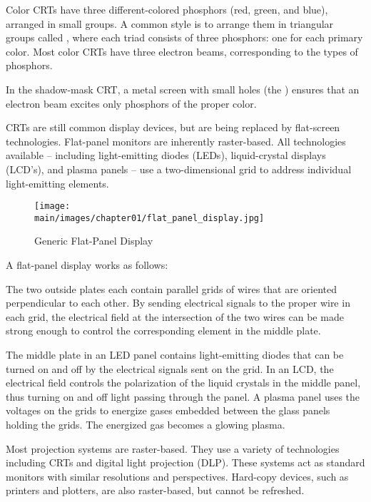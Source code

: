 \documentclass[\main/notes.tex]{subfiles}
\begin{document}
				Color CRTs have three different-colored phosphors (red, green, and blue),
				arranged in small groups.
				A common style is to arrange them in triangular groups called ,
				where each triad consists of three phosphors: one for each primary color.
				Most color CRTs have three electron beams, corresponding to the types of phosphors.

				In the shadow-mask CRT, a metal screen with small holes (the )
				ensures that an electron beam excites only phosphors of the proper color.

				CRTs are still common display devices, but are being replaced by flat-screen technologies.
				Flat-panel monitors are inherently raster-based.
				All technologies available -- including light-emitting diodes (LEDs),
				liquid-crystal displays (LCD's), and plasma panels --
				use a two-dimensional grid to address individual light-emitting elements.
				\pagebreak

				\begin{wrapfigure}{l}{0.5\textwidth}
					\begin{center}
						\texttt{[image: \\main/images/chapter01/flat\_panel\_display.jpg]}
					\end{center}
					\caption{Generic Flat-Panel Display}
				\end{wrapfigure}

				A flat-panel display works as follows:

				The two outside plates each contain parallel grids of wires that are oriented perpendicular
				to each other.
				By sending electrical signals to the proper wire in each grid,
				the electrical field at the intersection of the two wires
				can be made strong enough to control the corresponding element in the middle plate.

				The middle plate in an LED panel contains light-emitting diodes
				that can be turned on and off by the electrical signals sent on the grid.
				In an LCD, the electrical field controls the polarization of the liquid crystals in
				the middle panel,
				thus turning on and off light passing through the panel.
				A plasma panel uses the voltages on the grids to energize gases embedded between the
				glass panels holding the grids.
				The energized gas becomes a glowing plasma.

				Most projection systems are raster-based.
				They use a variety of technologies including CRTs and digital light projection (DLP).
				These systems act as standard monitors with similar resolutions and perspectives.
				Hard-copy devices, such as printers and plotters, are also raster-based, but cannot be
				refreshed.
\end{document}
